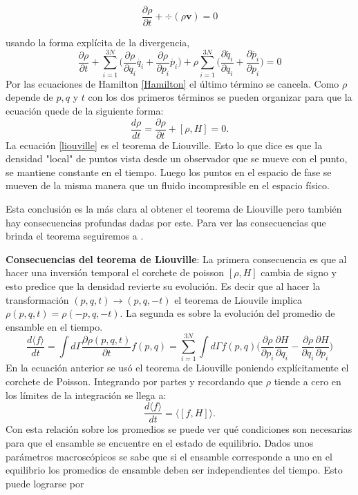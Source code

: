 \begin{equation} \label{con}
 \frac{\partial \rho}{\partial t} + \div{ ( \rho\mathbf{v} ) }=0
\end{equation}

usando la forma explícita de la divergencia,
\begin{equation}
 \frac{\partial \rho}{\partial t} +\sum_{i=1}^{3N} \Big( \frac{\partial\rho}{\partial q_{i}}\dot{q_{i}}+  \frac{\partial\rho}{\partial p_{i}}\dot{p_{i}} \Big) + \rho \sum_{i=1}^{3N} \Big( \frac{\partial \dot{q_{i}}}{\partial q_{i}} + \frac{\partial \dot{p_{i}}}{\partial p_{i}}\Big)=0
\end{equation}
Por las ecuaciones de Hamilton \ref{Hamilton} el último término se cancela. Como $\rho$ depende de $p,q$ y $t$ con los dos primeros términos se pueden organizar para que la ecuación quede de la siguiente forma:
\begin{equation} \label{liouville}
\frac{d \rho}{dt}= \frac{\partial \rho}{\partial t} + [ \rho, H ]=0.
\end{equation}
La ecuación \ref{liouville} es el teorema de Liouville. Esto lo que dice es que la densidad "local" de puntos vista desde un observador que se mueve con el punto, se mantiene constante en el tiempo. Luego los puntos en el espacio de fase se mueven de la misma manera que un fluido incompresible en el espacio físico.

Esta conclusión es la más clara al obtener el teorema de Liouville pero también hay consecuencias profundas dadas por este. Para ver las consecuencias que brinda el teorema seguiremos a \cite{KardarStat}.

\textbf{ Consecuencias del teorema de Liouville}: La primera consecuencia es que al hacer una inversión temporal el corchete de poisson $[\rho, H]$ cambia de signo y esto predice que la densidad revierte su evolución. Es decir que al hacer la transformación $(p,q,t) \to (p,q,-t)$ el teorema de Liouvile implica $\rho(p,q,t)=\rho(-p,q,-t)$.
La segunda es sobre la evolución del promedio de ensamble en el tiempo.
\begin{equation}
\frac{d \langle f \rangle}{dt}= \int d \Gamma \frac{\partial \rho(p,q,t)}{\partial t} f(p,q)= \sum_{i=1}^{3N} \int d\Gamma f(p,q) \Big( \frac{\partial \rho}{\partial p_{i}}\frac{\partial H}{\partial q_{i}} - \frac{\partial \rho}{\partial q_{i}}\frac{\partial H}{\partial p_{i}}  \Big)
\end{equation}
En la ecuación anterior se usó el teorema de Liouville poniendo explícitamente el corchete de Poisson. Integrando por partes y recordando que $\rho$ tiende a cero en los límites de la integración se llega a:
\begin{equation}
\frac{d \langle f \rangle}{dt}= \langle [f,H] \rangle.
\end{equation}
Con esta relación sobre los promedios se puede ver qué condiciones son necesarias para que el ensamble se encuentre en el estado de equilibrio. Dados unos parámetros macroscópicos se sabe que si el ensamble corresponde a uno en el equilibrio los promedios de ensamble deben ser independientes del tiempo. Esto puede lograrse por
 

